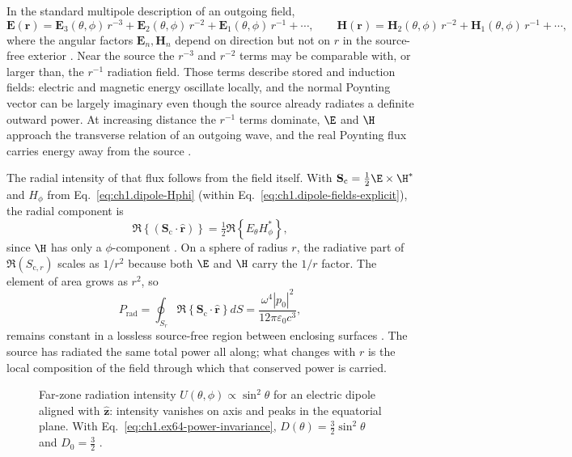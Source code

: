 In the standard multipole description of an outgoing field,
\begin{equation}
\label{eq:ch1.ex64-multipole-radial}
\mathbf{E}(\mathbf{r})=\mathbf{E}_3(\theta,\phi)\,r^{-3}+\mathbf{E}_2(\theta,\phi)\,r^{-2}+\mathbf{E}_1(\theta,\phi)\,r^{-1}+\cdots,
\qquad
\mathbf{H}(\mathbf{r})=\mathbf{H}_2(\theta,\phi)\,r^{-2}+\mathbf{H}_1(\theta,\phi)\,r^{-1}+\cdots,
\end{equation}
where the angular factors $\mathbf{E}_n,\mathbf{H}_n$ depend on direction but not on $r$ in the source-free exterior \cite{stratton1941}. Near the source the $r^{-3}$ and $r^{-2}$ terms may be comparable with, or larger than, the $r^{-1}$ radiation field. Those terms describe stored and induction fields: electric and magnetic energy oscillate locally, and the normal Poynting vector can be largely imaginary even though the source already radiates a definite outward power. At increasing distance the $r^{-1}$ terms dominate, $\E$ and $\H$ approach the transverse relation of an outgoing wave, and the real Poynting flux carries energy away from the source \cite{poynting1884}.

The radial intensity of that flux follows from the field itself. With
$\mathbf{S}_\mathrm{c}=\tfrac12\E\times\H^*$ and $H_\phi$ from
Eq.~\eqref{eq:ch1.dipole-Hphi} (within Eq.~\eqref{eq:ch1.dipole-fields-explicit}), the radial component is
\begin{equation}
\label{eq:ch1.dipole-sc-radial}
\Re\!\left\{(\mathbf{S}_\mathrm{c}\cdot\hat{\mathbf{r}})\right\}
=\tfrac12\Re\!\left\{E_\theta H_\phi^*\right\},
\end{equation}
since $\H$ has only a $\phi$-component \cite{stratton1941}.
On a sphere of radius $r$, the radiative part of $\Re(S_{\mathrm{c},r})$ scales as $1/r^2$ because both $\E$ and $\H$ carry the $1/r$ factor. The element of area grows as $r^2$, so
\begin{equation}
\label{eq:ch1.ex64-power-invariance}
P_{\mathrm{rad}}=\oint_{S_r}\Re\!\left\{\mathbf{S}_\mathrm{c}\cdot\hat{\mathbf{r}}\right\}dS
=\frac{\omega^4|p_0|^2}{12\pi\varepsilon_0 c^3},
\end{equation}
remains constant in a lossless source-free region between enclosing surfaces \cite{stratton1941}. The source has radiated the same total power all along; what changes with $r$ is the local composition of the field through which that conserved power is carried.

\begin{figure}[t]
\centering
\VolIPhysFig{\VolIPhysDipoleRadiationPattern}
\caption{Far-zone radiation intensity $U(\theta,\phi)\propto\sin^2\theta$ for an electric dipole aligned with $\hat{\mathbf{z}}$: intensity vanishes on axis and peaks in the equatorial plane. With Eq.~\eqref{eq:ch1.ex64-power-invariance}, $D(\theta)=\tfrac32\sin^2\theta$ and $D_0=\tfrac32$ \cite{stratton1941,harrington2001}.}
\label{fig:ch1.dipole-radiation-pattern}
\end{figure}

